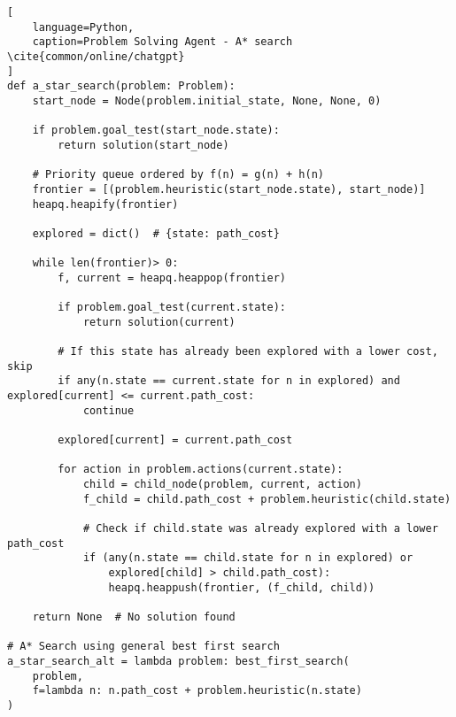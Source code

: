 \begin{lstlisting}[
    language=Python,
    caption=Problem Solving Agent - A* search \cite{common/online/chatgpt}
]
def a_star_search(problem: Problem):
    start_node = Node(problem.initial_state, None, None, 0)

    if problem.goal_test(start_node.state):
        return solution(start_node)

    # Priority queue ordered by f(n) = g(n) + h(n)
    frontier = [(problem.heuristic(start_node.state), start_node)]
    heapq.heapify(frontier)

    explored = dict()  # {state: path_cost}

    while len(frontier)> 0:
        f, current = heapq.heappop(frontier)

        if problem.goal_test(current.state):
            return solution(current)

        # If this state has already been explored with a lower cost, skip
        if any(n.state == current.state for n in explored) and explored[current] <= current.path_cost:
            continue

        explored[current] = current.path_cost

        for action in problem.actions(current.state):
            child = child_node(problem, current, action)
            f_child = child.path_cost + problem.heuristic(child.state)

            # Check if child.state was already explored with a lower path_cost
            if (any(n.state == child.state for n in explored) or 
                explored[child] > child.path_cost):
                heapq.heappush(frontier, (f_child, child))

    return None  # No solution found

# A* Search using general best first search
a_star_search_alt = lambda problem: best_first_search(
    problem, 
    f=lambda n: n.path_cost + problem.heuristic(n.state)
)
\end{lstlisting}











